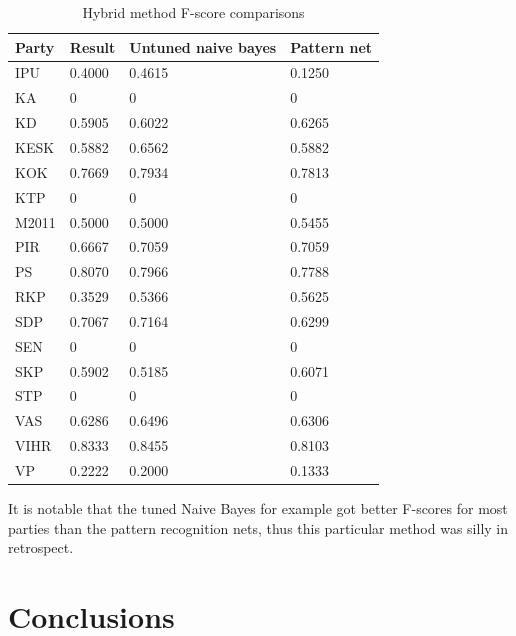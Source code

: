 \documentclass[a4paper,10pt]{article}
\begin{document}
\begin{table}
	\caption{Hybrid method F-score comparisons}
    \begin{tabular}{|l|l|l|l|}
    \hline
    Party & Result   & Untuned naive bayes & Pattern net \\ \hline
    IPU   & 0.4000   & 0.4615              & 0.1250      \\ \hline
    KA    & 0        & 0                   & 0           \\ \hline
    KD    & 0.5905   & 0.6022              & 0.6265      \\ \hline
    KESK  & 0.5882   & 0.6562              & 0.5882      \\ \hline
    KOK   & 0.7669   & 0.7934              & 0.7813      \\ \hline
    KTP   & 0        & 0                   & 0           \\ \hline
    M2011 & 0.5000   & 0.5000              & 0.5455      \\ \hline
    PIR   & 0.6667   & 0.7059              & 0.7059      \\ \hline
    PS    & 0.8070   & 0.7966              & 0.7788      \\ \hline
    RKP   & 0.3529   & 0.5366              & 0.5625      \\ \hline
    SDP   & 0.7067   & 0.7164              & 0.6299      \\ \hline
    SEN   & 0        & 0                   & 0           \\ \hline
    SKP   & 0.5902   & 0.5185              & 0.6071      \\ \hline
    STP   & 0        & 0                   & 0           \\ \hline
    VAS   & 0.6286   & 0.6496              & 0.6306      \\ \hline
    VIHR  & 0.8333   & 0.8455              & 0.8103      \\ \hline
    VP    & 0.2222   & 0.2000              & 0.1333      \\ \hline
    \end{tabular}
\end{table}

It is notable that the tuned Naive Bayes for example got better F-scores for most parties than the pattern recognition nets, thus this particular method was silly in retrospect.

\section{Conclusions}
\end{document}
